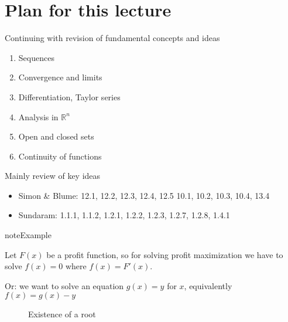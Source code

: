 \documentclass[letterpaper,10pt,english]{jupyterBook}
\begin{document}
\section{Plan for this lecture}
\label{\detokenize{04.basic_analysis:plan-for-this-lecture}}
\sphinxAtStartPar
Continuing with revision of fundamental concepts and ideas
\begin{enumerate}
%
\item {} 
\sphinxAtStartPar
Sequences

\item {} 
\sphinxAtStartPar
Convergence and limits

\item {} 
\sphinxAtStartPar
Differentiation, Taylor series

\item {} 
\sphinxAtStartPar
Analysis in \(\mathbb{R}^n\)

\item {} 
\sphinxAtStartPar
Open and closed sets

\item {} 
\sphinxAtStartPar
Continuity of functions

\end{enumerate}

\sphinxAtStartPar
Mainly review of key ideas

\sphinxAtStartPar
{}
\begin{itemize}
\item {} 
\sphinxAtStartPar
Simon \& Blume: 12.1, 12.2, 12.3, 12.4, 12.5 10.1, 10.2, 10.3, 10.4, 13.4

\item {} 
\sphinxAtStartPar
Sundaram: 1.1.1, 1.1.2, 1.2.1, 1.2.2, 1.2.3, 1.2.7, 1.2.8, 1.4.1

\end{itemize}

\begin{sphinxadmonition}{note}{Example}

\sphinxAtStartPar
Let \(F(x)\) be a profit function, so for solving profit maximization we have to solve \(f(x)=0\) where \(f(x)=F'(x)\).

\sphinxAtStartPar
Or: we want to solve an equation \(g(x) = y\) for \(x\), equivalently
\(f(x) = g(x) - y\)
\end{sphinxadmonition}

\begin{figure}[htbp]
\centering
\capstart

\noindent{}
\caption{Existence of a root}\label{\detokenize{04.basic_analysis:root}}\end{figure}
\end{document}
